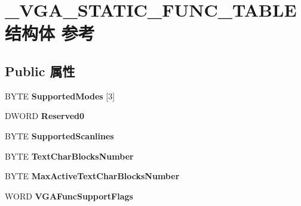 \hypertarget{struct___v_g_a___s_t_a_t_i_c___f_u_n_c___t_a_b_l_e}{}\section{\+\_\+\+V\+G\+A\+\_\+\+S\+T\+A\+T\+I\+C\+\_\+\+F\+U\+N\+C\+\_\+\+T\+A\+B\+L\+E结构体 参考}
\label{struct___v_g_a___s_t_a_t_i_c___f_u_n_c___t_a_b_l_e}
\subsection*{Public 属性}
\begin{DoxyCompactItemize}
\item 
\mbox{\label{struct___v_g_a___s_t_a_t_i_c___f_u_n_c___t_a_b_l_e_af83d25922c6aff16feff204944eee196}} 
B\+Y\+TE {\bfseries Supported\+Modes} \mbox{[}3\mbox{]}
\item 
\mbox{\label{struct___v_g_a___s_t_a_t_i_c___f_u_n_c___t_a_b_l_e_a455009c62f466575efd8a3866370b6bd}} 
D\+W\+O\+RD {\bfseries Reserved0}
\item 
\mbox{\label{struct___v_g_a___s_t_a_t_i_c___f_u_n_c___t_a_b_l_e_acb7f2a74ae02c0deb57bf9ebe57d369a}} 
B\+Y\+TE {\bfseries Supported\+Scanlines}
\item 
\mbox{\label{struct___v_g_a___s_t_a_t_i_c___f_u_n_c___t_a_b_l_e_a13aa65dec3b66d90171d90e41b000f76}} 
B\+Y\+TE {\bfseries Text\+Char\+Blocks\+Number}
\item 
\mbox{\label{struct___v_g_a___s_t_a_t_i_c___f_u_n_c___t_a_b_l_e_adf849bcf395169866235e452eb092222}} 
B\+Y\+TE {\bfseries Max\+Active\+Text\+Char\+Blocks\+Number}
\item 
\mbox{\label{struct___v_g_a___s_t_a_t_i_c___f_u_n_c___t_a_b_l_e_ac1b37df21bfb60007209a94f4d19f52b}} 
W\+O\+RD {\bfseries V\+G\+A\+Func\+Support\+Flags}
\item 

\end{DoxyCompactItemize}
